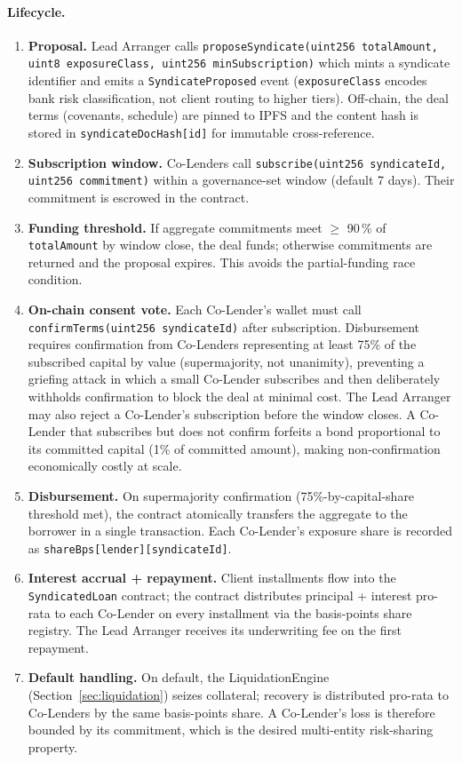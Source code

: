 \documentclass[12pt,a4paper]{report}
\begin{document}
\paragraph{Lifecycle.}

\begin{enumerate}[noitemsep]
\item \textbf{Proposal.} Lead Arranger calls \texttt{proposeSyndicate(uint256 totalAmount, uint8 exposureClass, uint256 minSubscription)} which mints a syndicate identifier and emits a \texttt{SyndicateProposed} event (\texttt{exposureClass} encodes bank risk classification, not client routing to higher tiers). Off-chain, the deal terms (covenants, schedule) are pinned to IPFS and the content hash is stored in \texttt{syndicateDocHash[id]} for immutable cross-reference.
\item \textbf{Subscription window.} Co-Lenders call \texttt{subscribe(uint256 syndicateId, uint256 commitment)} within a governance-set window (default 7 days). Their commitment is escrowed in the contract.
\item \textbf{Funding threshold.} If aggregate commitments meet $\ge$ 90\,\% of \texttt{totalAmount} by window close, the deal funds; otherwise commitments are returned and the proposal expires. This avoids the partial-funding race condition.
\item \textbf{On-chain consent vote.} Each Co-Lender's wallet must call \texttt{confirmTerms(uint256 syndicateId)} after subscription. Disbursement requires confirmation from Co-Lenders representing at least 75\% of the subscribed capital by value (supermajority, not unanimity), preventing a griefing attack in which a small Co-Lender subscribes and then deliberately withholds confirmation to block the deal at minimal cost. The Lead Arranger may also reject a Co-Lender's subscription before the window closes. A Co-Lender that subscribes but does not confirm forfeits a bond proportional to its committed capital (1\% of committed amount), making non-confirmation economically costly at scale.
\item \textbf{Disbursement.} On supermajority confirmation (75\%-by-capital-share threshold met), the contract atomically transfers the aggregate to the borrower in a single transaction. Each Co-Lender's exposure share is recorded as \texttt{shareBps[lender][syndicateId]}.
\item \textbf{Interest accrual + repayment.} Client installments flow into the \texttt{SyndicatedLoan} contract; the contract distributes principal + interest pro-rata to each Co-Lender on every installment via the basis-points share registry. The Lead Arranger receives its underwriting fee on the first repayment.
\item \textbf{Default handling.} On default, the LiquidationEngine (Section~\ref{sec:liquidation}) seizes collateral; recovery is distributed pro-rata to Co-Lenders by the same basis-points share. A Co-Lender's loss is therefore bounded by its commitment, which is the desired multi-entity risk-sharing property.
\end{enumerate}
\end{document}

